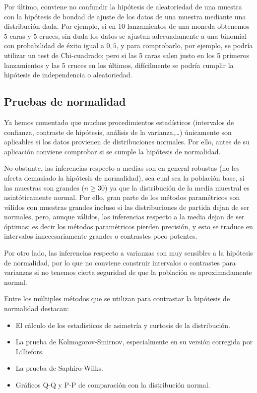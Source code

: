 \begin{description}
Por último, conviene no confundir la hipótesis de aleatoriedad de una muestra con la hipótesis de bondad de ajuste de los datos de una muestra mediante una distribución dada. Por ejemplo, si en 10 lanzamientos de una moneda obtenemos 5 caras y 5 cruces, sin duda los datos se ajustan adecuadamente a una binomial con probabilidad de éxito igual a $0,5$, y para comprobarlo, por ejemplo, se podría utilizar un test de Chi-cuadrado; pero si las 5 caras salen justo en los 5 primeros lanzamientos y las 5 cruces en los últimos, difícilmente se podría cumplir la hipótesis de independencia o aleatoriedad.


\subsection{Pruebas de normalidad}
Ya hemos comentado que muchos procedimientos estadísticos
(intervalos de confianza, contraste de hipótesis, análisis de la varianza,\ldots)
únicamente son aplicables si los datos provienen de distribuciones normales.
Por ello, antes de su aplicación conviene comprobar si se cumple la
hipótesis de normalidad.

No obstante, las inferencias respecto a medias son en general
robustas (no les afecta demasiado la hipótesis de normalidad), sea
cual sea la población base, si las muestras son grandes
($n\geq30$) ya que la distribución de la media muestral es
asintóticamente normal. Por ello, gran parte de los métodos paramétricos son válidos con muestras
grandes incluso si las distribuciones de partida dejan de ser normales, pero, aunque válidos,
 las inferencias respecto a la media dejan de ser
óptimas; es decir los métodos paramétricos pierden precisión, y esto se traduce en intervalos innecesariamente grandes o contrastes
poco potentes.

Por otro lado, las inferencias respecto a varianzas son muy
sensibles a la hipótesis de normalidad, por lo que no conviene
construir intervalos o contrastes para varianzas si no tenemos
cierta seguridad de que la población es aproximadamente normal.

Entre los múltiples métodos que se utilizan para contrastar la
hipótesis de normalidad destacan:

\begin{itemize}
\item El cálculo de los estadísticos de asimetría y curtosis de la
distribución.
\item La prueba de Kolmogorov-Smirnov, especialmente en su versión corregida por Lilliefors.
\item La prueba de Saphiro-Wilks.
\item Gráficos Q-Q y P-P de comparación con la distribución normal.
\end{itemize}


\end{description}
